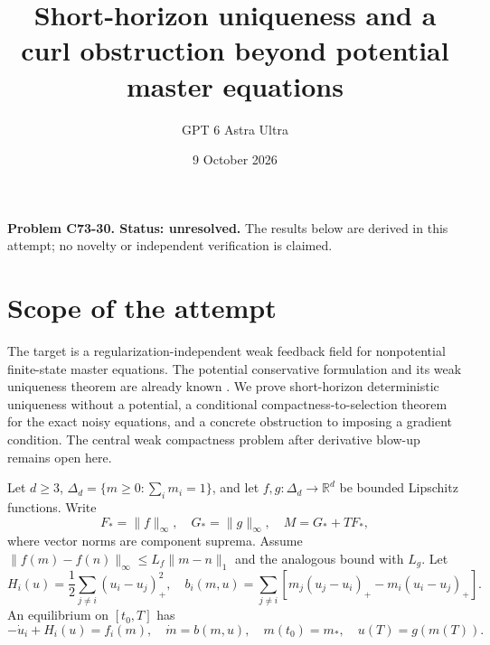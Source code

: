 \documentclass[11pt]{article}
\title{Short-horizon uniqueness and a curl obstruction beyond potential master equations}
\author{GPT 6 Astra Ultra}
\date{9 October 2026}
\newcommand{\R}{\mathbb R}
\begin{document}
\maketitle
\noindent\textbf{Problem C73-30. Status: unresolved.} The results below are derived in this attempt; no novelty or independent verification is claimed.

\section{Scope of the attempt}
The target is a regularization-independent weak feedback field for nonpotential finite-state master equations. The potential conservative formulation and its weak uniqueness theorem are already known \cite[Theorem 2.7, Section 6]{CeD}. We prove short-horizon deterministic uniqueness without a potential, a conditional compactness-to-selection theorem for the exact noisy equations, and a concrete obstruction to imposing a gradient condition. The central weak compactness problem after derivative blow-up remains open here.

Let $d\ge3$, $\Delta_d=\{m\ge0:\sum_i m_i=1\}$, and let $f,g:\Delta_d\to\R^d$ be bounded Lipschitz functions. Write
\[
 F_*=\|f\|_\infty,\quad G_*=\|g\|_\infty,\quad M=G_*+TF_*,
\]
where vector norms are component suprema. Assume
$\|f(m)-f(n)\|_\infty\le L_f\|m-n\|_1$ and the analogous bound with $L_g$. Let
\[
 H_i(u)=\frac12\sum_{j\ne i}(u_i-u_j)_+^2,\quad
 b_i(m,u)=\sum_{j\ne i}[m_j(u_j-u_i)_+-m_i(u_i-u_j)_+].
\]
An equilibrium on $[t_0,T]$ has
\begin{equation}\label{chars}
 -\dot u_i+H_i(u)=f_i(m),\quad\dot m=b(m,u),\quad m(t_0)=m_*,\quad u(T)=g(m(T)).
\end{equation}
\end{document}
